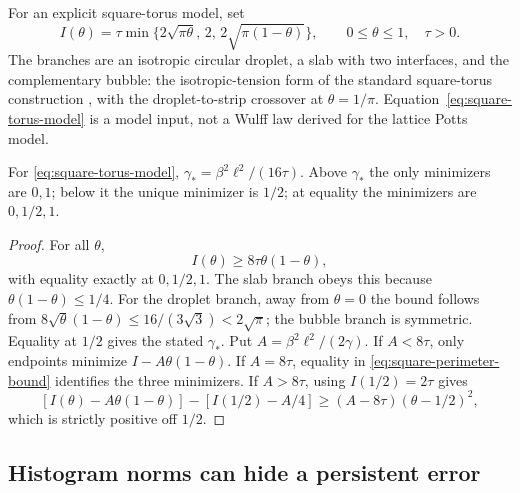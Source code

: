 For an explicit square-torus model, set
\begin{equation}
 I(\theta)=\tau\min\{2\sqrt{\pi\theta},\,2,\,
                         2\sqrt{\pi(1-\theta)}\},
 \qquad 0\le\theta\le1,\quad \tau>0.
 \label{eq:square-torus-model}
\end{equation}
The branches are an isotropic circular droplet, a slab with two
interfaces, and the complementary bubble: the isotropic-tension form
of the standard square-torus construction
\cite{LeungZia1990,NeuhausHager2003}, with the droplet-to-strip
crossover at $\theta=1/\pi$. Equation~\eqref{eq:square-torus-model}
is a model input, not a Wulff law derived for the lattice Potts
model.

\begin{corollary}
\label{cor:square-capillarity}
For \eqref{eq:square-torus-model},
$\gamma_*=\beta^2\ell^2/(16\tau)$.
Above $\gamma_*$ the only minimizers are $0,1$; below it the unique
minimizer is $1/2$; at equality the minimizers are $0,1/2,1$.
\end{corollary}
\begin{proof}
For all $\theta$,
\begin{equation}
 I(\theta)\ge8\tau\theta(1-\theta),
 \label{eq:square-perimeter-bound}
\end{equation}
with equality exactly at $0,1/2,1$.
The slab branch obeys this because $\theta(1-\theta)\le1/4$.
For the droplet branch, away from $\theta=0$ the bound follows
from
$8\sqrt\theta(1-\theta)\le16/(3\sqrt3)<2\sqrt\pi$;
the bubble branch is symmetric. Equality at $1/2$ gives the stated
$\gamma_*$.
Put $A=\beta^2\ell^2/(2\gamma)$.
If $A<8\tau$, only endpoints minimize $I-A\theta(1-\theta)$.
If $A=8\tau$, equality in \eqref{eq:square-perimeter-bound} identifies
the three minimizers. If $A>8\tau$, using $I(1/2)=2\tau$ gives
\[
 [I(\theta)-A\theta(1-\theta)]-[I(1/2)-A/4]
 \ge(A-8\tau)(\theta-1/2)^2,
\]
which is strictly positive off $1/2$.
\end{proof}

\subsection{Histogram norms can hide a persistent error}

